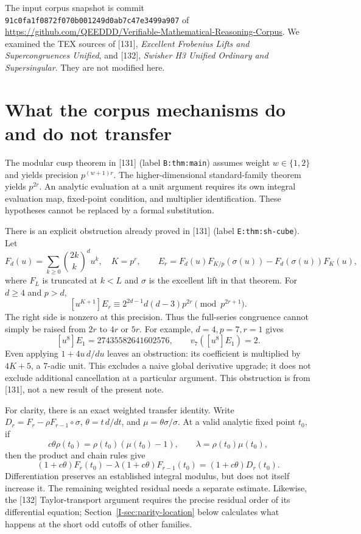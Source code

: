 \documentclass[11pt,letterpaper]{article}
\numberwithin{equation}{section}
\begin{document}
The input corpus snapshot is commit
\texttt{91c0fa1f0872f070b001249d0ab7c47e3499a907} of
\url{https://github.com/QEEDDD/Verifiable-Mathematical-Reasoning-Corpus}.
We examined the TEX sources of [131], \emph{Excellent Frobenius Lifts
and Supercongruences Unified}, and [132], \emph{Swisher H3 Unified
Ordinary and Supersingular}. They are not modified here.


\section{What the corpus mechanisms do and do not transfer}\label{loc-I-2}
The modular cusp theorem in [131] (label \texttt{B:thm:main}) assumes
weight $w\in\{1,2\}$ and yields precision $p^{(w+1)r}$.
The higher-dimensional standard-family theorem yields $p^{2r}$.
An analytic evaluation at a unit argument requires its own integral
evaluation map, fixed-point condition, and multiplier identification.
These hypotheses cannot be replaced by a formal substitution.

There is an explicit obstruction already proved in [131]
(label \texttt{E:thm:sh-cube}). Let
\[
 F_d(u)=\sum_{k\ge0}\binom{2k}{k}^du^k,\quad K=p^r,\qquad
 E_r=F_d(u)F_{K/p}(\sigma(u))-F_d(\sigma(u))F_K(u),
\]
where $F_L$ is truncated at $k<L$ and $\sigma$ is the excellent lift
in that theorem. For $d\ge4$ and $p>d$,
\[
 [u^{K+1}]E_r\equiv2^{2d-1}d(d-3)p^{2r}\pmod{p^{2r+1}}.
\]
The right side is nonzero at this precision. Thus the full-series
congruence cannot simply be raised from $2r$ to $4r$ or $5r$.
For example, $d=4,p=7,r=1$ gives
\[
 [u^8]E_1=27435582641602576,\qquad v_7([u^8]E_1)=2.
\]
Even applying $1+4u\,d/du$ leaves an obstruction: its coefficient is
multiplied by $4K+5$, a $7$-adic unit. This excludes a naive global
derivative upgrade; it does not exclude additional cancellation at a
particular argument. This obstruction is from [131], not a new result
of the present note.

For clarity, there is an exact weighted transfer identity.
Write $D_r=F_r-\rho F_{r-1}\circ\sigma$,
$\theta=t\,d/dt$, and $\mu=\theta\sigma/\sigma$.
At a valid analytic fixed point $t_0$, if
\[
 c\theta\rho(t_0)=\rho(t_0)(\mu(t_0)-1),\qquad
 \lambda=\rho(t_0)\mu(t_0),
\]
then the product and chain rules give
\[
 (1+c\theta)F_r(t_0)-\lambda(1+c\theta)F_{r-1}(t_0)
 =(1+c\theta)D_r(t_0).
\]
Differentiation preserves an established integral modulus, but does
not itself increase it. The remaining weighted residual needs a
separate estimate. Likewise, the [132] Taylor-transport argument
requires the precise residual order of its differential equation;
Section~\ref{I-sec:parity-location} below calculates what happens at
the short odd cutoffs of other families.
\end{document}

